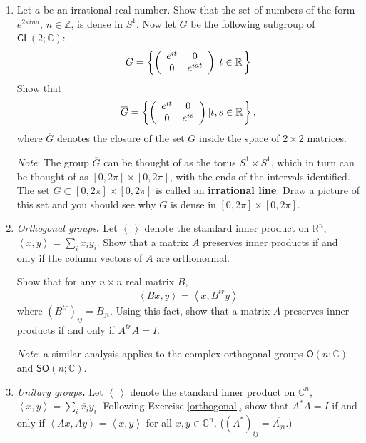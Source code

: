 \documentclass{amsbook}
\theoremstyle{plain}
\numberwithin{equation}{chapter}
\numberwithin{theorem}{chapter}
\begin{document}
\begin{enumerate}
\item \label{not.closed}Let $a$ be an irrational real number. Show that the
set of numbers of the form $e^{2\pi ina}$, $n\in\mathbb{Z}$, is dense in
$S^{1}$. Now let $G$ be the following subgroup of $\mathsf{GL}(2;\mathbb{C}%
)$:
\[
G=\left\{  \left(
\begin{array}
[c]{cc}%
e^{it} & 0\\
0 & e^{iat}%
\end{array}
\right)  \left|  t\in\mathbb{R}\right.  \right\}
\]
Show that
\[
\overline{G}=\left\{  \left(
\begin{array}
[c]{cc}%
e^{it} & 0\\
0 & e^{is}%
\end{array}
\right)  \left|  t,s\in\mathbb{R}\right.  \right\}  ,
\]
where $\overline{G}$ denotes the closure of the set $G$ inside the space of
$2\times2$ matrices.

\textit{Note}: The group $\overline{G}$ can be thought of as the torus
$S^{1}\times S^{1}$, which in turn can be thought of as $\left[
0,2\pi\right]  \times\left[  0,2\pi\right]  $, with the ends of the intervals
identified. The set $G\subset\left[  0,2\pi\right]  \times\left[
0,2\pi\right]  $ is called an \textbf{irrational line}. Draw a picture of this
set and you should see why $G$ is dense in $\left[  0,2\pi\right]
\times\left[  0,2\pi\right]  $.

\item \label{orthogonal}\textit{Orthogonal groups}\textbf{.} Let $\left\langle
\ \right\rangle $ denote the standard inner product on $\mathbb{R}^{n}$,
$\left\langle x,y\right\rangle =\sum_{i}x_{i}y_{i}$. Show that a matrix $A$
preserves inner products if and only if the column vectors of $A$ are orthonormal.

Show that for any $n\times n$ real matrix $B$,
\[
\left\langle Bx,y\right\rangle =\left\langle x,B^{tr}y\right\rangle
\]
where $\left(  B^{tr}\right)  _{ij}=B_{ji}$. Using this fact, show that a
matrix $A$ preserves inner products if and only if $A^{tr}A=I$.

\textit{Note}: a similar analysis applies to the complex orthogonal groups
$\mathsf{O}(n;\mathbb{C})$ and $\mathsf{SO}(n;\mathbb{C})$.

\item \label{unitary}\textit{Unitary groups}\textbf{.} Let $\left\langle
\ \right\rangle $ denote the standard inner product on $\mathbb{C}^{n}$,
$\left\langle x,y\right\rangle =\sum_{i}\overline{x_{i}}y_{i}$. Following
Exercise \ref{orthogonal}, show that $A^{\ast}A=I$ if and only if
$\left\langle Ax,Ay\right\rangle =\left\langle x,y\right\rangle $ for all
$x,y\in\mathbb{C}^{n}$. ($\left(  A^{\ast}\right)  _{ij}=\overline{A_{ji}}$.)


\end{enumerate}
\end{document}
